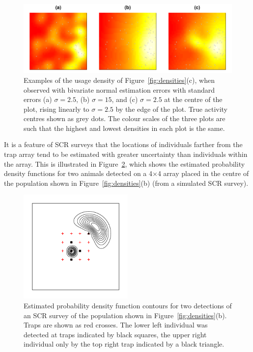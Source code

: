 \documentclass[10pt,a4paper]{article}
\begin{document}
\begin{figure}[htbp]
\centering
\includegraphics[width=\textwidth]{acuseesterr.pdf}
\caption{Examples of the usage density of Figure~\ref{fig:densities}(c), when observed with bivariate normal estimation errors with standard errors (a) $\sigma=2.5$, (b) $\sigma=15$, and (c) $\sigma=2.5$ at the centre of the plot, rising linearly to $\sigma=2.5$ by the edge of the plot. True activity centres shown as grey dots. The colour scales of the three plots are such that the highest and lowest densities in each plot is the same.}
\label{fig:acuseesterr}
\end{figure}

It is a feature of SCR surveys that the locations of individuals farther from the trap array tend to be estimated with greater uncertainty than individuals within the array. This is illustrated in Figure~\ref{fig:screrr}, which shows the estimated probability density functions for two animals detected on a 4$\times$4 array placed in the centre of the population shown in Figure~\ref{fig:densities}(b) (from a simulated SCR survey). 

\begin{figure}[htbp]
\centering
\includegraphics[width=0.5\textwidth]{screrr.pdf}
\caption{Estimated probability density function contours for two detections of an SCR survey of the population shown in Figure~\ref{fig:densities}(b). Traps are shown as red crosses. The lower left individual was detected at traps indicated by black squares, the upper right individual only by the top right trap indicated by a black triangle.}
\label{fig:screrr}
\end{figure}
\end{document}
